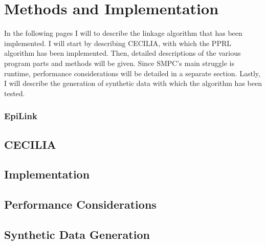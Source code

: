
\chapter{Methods and Implementation}
  \label{Methods}
In the following pages I will to describe the linkage algorithm that has been implemented.
I will start by describing \ac{CECILIA}, with which the \ac{PPRL} algorithm has been implemented.
Then, detailed descriptions of the various program parts and methods will be given.
Since \ac{SMPC}'s main struggle is runtime, performance considerations will be detailed in a separate section.
Lastly, I will describe the generation of synthetic data with which the algorithm has been tested.

\subsection{EpiLink}
\section{\ac{CECILIA}}
\section{Implementation}
\section{Performance Considerations}
\section{Synthetic Data Generation}
